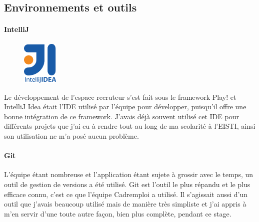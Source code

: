 \subsection{Environnements et outils}
\paragraph{IntelliJ}
\label{par:IntelliJ}
\begin{figure}
  \vspace{-2.5em}
  \begin{center}
    \includegraphics[width=0.15\textwidth]{Pictures/intellij_logo.png}
  \end{center}
\end{figure}
Le développement de l'espace recruteur s'est fait sous le framework Play! et IntelliJ Idea était l'IDE utilisé par l'équipe pour développer, puisqu'il offre une bonne intégration de ce framework.
J'avais déjà souvent utilisé cet IDE pour différents projets que j'ai eu à rendre tout au long de ma scolarité à l'EISTI, ainsi son utilisation ne m'a posé aucun problème.
\paragraph{Git}
\label{par:Git}
L'équipe étant nombreuse et l'application étant sujete à grossir avec le temps, un outil de gestion de versions a été utilisé.
Git est l'outil le plus répandu et le plus efficace connu, c'est ce que l'équipe Cadremploi a utilisé.
Il s'agissait aussi d'un outil que j'avais beaucoup utilisé mais de manière très simpliste et j'ai appris à m'en servir d'une toute autre façon, bien plus complète, pendant ce stage.
